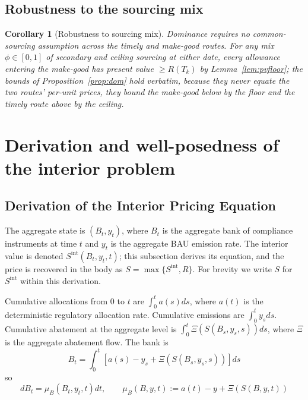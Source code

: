 \documentclass[11pt,letterpaper]{article}
\theoremstyle{plain}
\newtheorem{corollary}[theorem]{Corollary}
\theoremstyle{definition}
\numberwithin{equation}{section}
\begin{document}
\subsection{Robustness to the sourcing mix}

\begin{corollary}[Robustness to sourcing mix]\label{cor:domrobust}
Dominance requires no common-sourcing assumption across the timely and make-good routes. For any mix $\phi\in[0,1]$ of secondary and ceiling sourcing at either date, every allowance entering the make-good has present value $\ge R(T_k)$ by Lemma~\ref{lem:pvfloor}; the bounds of Proposition~\ref{prop:dom} hold verbatim, because they never equate the two routes' per-unit prices, they bound the make-good below by the floor and the timely route above by the ceiling.
\end{corollary}

\section{Derivation and well-posedness of the interior problem}\label{app:interior}
\subsection{Derivation of the Interior Pricing Equation}\label{subsec:interior-pde}

The aggregate state is $(B_t, y_t)$, where $B_t$ is the aggregate bank of compliance instruments at time $t$ and $y_t$ is the aggregate BAU emission rate. The interior value is denoted $S^{\mathrm{int}}(B_t,y_t,t)$; this subsection derives its equation, and the price is recovered in the body as $S=\max\{S^{\mathrm{int}},R\}$. For brevity we write $S$ for $S^{\mathrm{int}}$ within this derivation.

Cumulative allocations from $0$ to $t$ are $\int_0^t a(s) ds$, where $a(t)$ is the deterministic regulatory allocation rate. Cumulative emissions are $\int_0^t y_s ds$. Cumulative abatement at the aggregate level is $\int_0^t \Xi(S(B_s, y_s, s))ds$, where $\Xi$ is the aggregate abatement flow. The bank is 
\begin{equation}\label{eq:aggbank}
B_t=\int_0^t [a(s)-y_s+\Xi(S(B_s,y_s,s))]ds
\end{equation}
so
\begin{equation}\label{eq:bankdynamics}
dB_t=\mu_B(B_t,y_t,t)dt, \qquad \mu_B(B,y,t) := a(t)-y+\Xi(S(B,y,t))
\end{equation}
\end{document}
